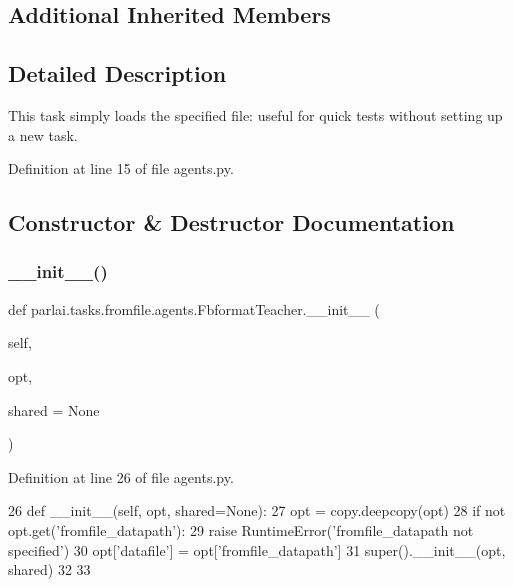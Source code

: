 \subsection*{Additional Inherited Members}


\subsection{Detailed Description}
\begin{DoxyVerb}This task simply loads the specified file: useful for quick tests without setting up
a new task.
\end{DoxyVerb}
 

Definition at line 15 of file agents.\+py.



\subsection{Constructor \& Destructor Documentation}
\mbox{\label{classparlai_1_1tasks_1_1fromfile_1_1agents_1_1FbformatTeacher_a25b182854666fb92190c1d5375aba2b2}} 
\subsubsection{\texorpdfstring{\+\_\+\+\_\+init\+\_\+\+\_\+()}{\_\_init\_\_()}}
{\footnotesize\ttfamily def parlai.\+tasks.\+fromfile.\+agents.\+Fbformat\+Teacher.\+\_\+\+\_\+init\+\_\+\+\_\+ (\begin{DoxyParamCaption}\item[{}]{self,  }\item[{}]{opt,  }\item[{}]{shared = {\ttfamily None} }\end{DoxyParamCaption})}



Definition at line 26 of file agents.\+py.


\begin{DoxyCode}
26     \textcolor{keyword}{def }\_\_init\_\_(self, opt, shared=None):
27         opt = copy.deepcopy(opt)
28         \textcolor{keywordflow}{if} \textcolor{keywordflow}{not} opt.get(\textcolor{stringliteral}{'fromfile\_datapath'}):
29             \textcolor{keywordflow}{raise} RuntimeError(\textcolor{stringliteral}{'fromfile\_datapath not specified'})
30         opt[\textcolor{stringliteral}{'datafile'}] = opt[\textcolor{stringliteral}{'fromfile\_datapath'}]
31         super().\_\_init\_\_(opt, shared)
32 
33 
\end{DoxyCode}



